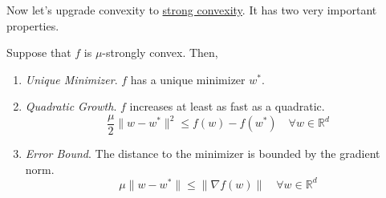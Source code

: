 	Now let's upgrade convexity to \hyperref[mv-def:mu-strongly-convex]{strong convexity}. It has two very important properties. 

	\begin{lemma}
	  \label{thm:uniqueness-and-distance-bound-to-minimizer-of}
		Suppose that $f$ is $\mu$-strongly convex. Then, 
		\begin{enumerate}
		  \item \textit{Unique Minimizer}. $f$ has a unique minimizer $w^\ast$. 
			\item \textit{Quadratic Growth}. $f$ increases at least as fast as a quadratic.  
				\begin{equation}
					\frac{\mu}{2} \|w - w^\ast\|^2 \leq f(w) - f(w^\ast) \quad \forall w \in \mathbb{R}^d
				\end{equation}

			\item \textit{Error Bound}. The distance to the minimizer is bounded by the gradient norm. 
				\begin{equation}
					\mu \|w - w^\ast\| \leq \|\nabla f(w)\| \quad \forall w \in \mathbb{R}^d
				\end{equation}
		\end{enumerate}
	\end{lemma}
